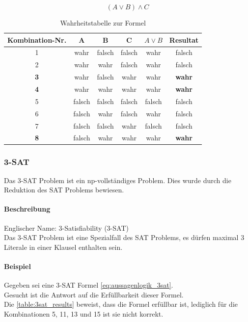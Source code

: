 	\begin{equation}
   		(A \vee B) \wedge C
  		 \label{eq:aussagenlogik}
	\end{equation}

\begin{table}[ht]
\centering
  \begin{tabular}{ c | c | c | c | c | c}
	\hline
	\rowcolor{gray}
	\textbf{Kombination-Nr.}	&	\textbf{A}	&	\textbf{B} 	& 	\textbf{C} 	&	$A \vee B$	&	\textbf{Resultat}\\ \hline
	1			&	wahr	& 	falsch	& 	falsch	&	wahr		&	falsch\\ \hline
	2			&	wahr	& 	wahr	& 	falsch	&	wahr		&	falsch\\ \hline
	\textbf{3}		&	wahr	& 	falsch	& 	wahr	&	wahr		&	\textbf{wahr}\\ \hline
	\textbf{4}		&	wahr	& 	wahr	& 	wahr	&	wahr		&	\textbf{wahr}\\ \hline
	5			&	falsch	& 	falsch	& 	falsch	&	falsch		&	falsch\\ \hline
	6			&	falsch	& 	wahr	& 	falsch	&	wahr		&	falsch\\ \hline
	7			&	falsch	& 	falsch	& 	wahr	&	falsch		&	falsch\\ \hline
	\textbf{8}		&	falsch	& 	wahr	& 	wahr	&	wahr		&	\textbf{wahr}\\ \hline
  \end{tabular}
   \caption{Wahrheitstabelle zur  Formel}\label{table:sat_results}
\end{table}

\newpage
	\subsubsection{3-SAT}\label{3sat}
	Das 3-SAT Problem ist ein \gls{np}-vollständiges Problem. Dies wurde durch die Reduktion des SAT Problems bewiesen.

	\paragraph{Beschreibung}
	Englischer Name: 3-Satisfiability (3-SAT)\\
	Das 3-SAT Problem ist eine Spezialfall des SAT Problems, es dürfen maximal 3 Literale in einer Klausel enthalten sein.

	\paragraph{Beispiel} Gegeben sei eine 3-SAT Formel \ref{eq:aussagenlogik_3sat}.\\
	Gesucht ist die Antwort auf die Erfüllbarkeit dieser Formel.\\
	Die \autoref{table:3sat_results} beweist, dass die Formel erfüllbar ist, lediglich für die Kombinationen 5, 11, 13 und 15 ist sie nicht korrekt.

